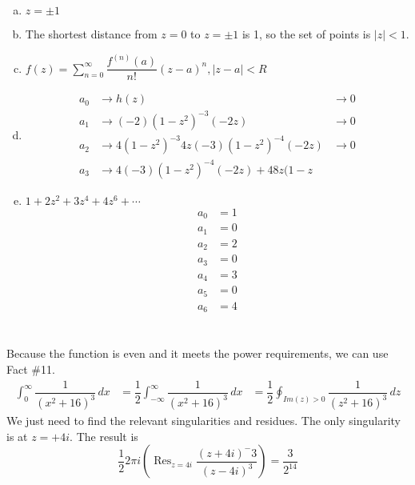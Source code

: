 \documentclass[12pt]{article}
\begin{document}
\section{}
\begin{enumerate}[(a)]
	\item $ z=\pm 1 $
	
	\item The shortest distance from $ z=0 $ to $ z=\pm 1 $ is 1, so the set of points is $ |z| < 1 $.
	
	\item $ f(z) = \sum_{n=0}^{\infty} \dfrac{f^(n)(a)}{n!} (z-a)^n, |z-a| < R$
	
	\item \begin{align*}
		a_0 &\rightarrow h(z) &\rightarrow  0\\
		a_1 &\rightarrow (-2)(1-z^2)^{-3}(-2z) &\rightarrow 0\\
		a_2 &\rightarrow 4(1-z^2)^{-3} 4z(-3)(1-z^2)^{-4}(-2z) &\rightarrow 0\\
		a_3 &\rightarrow 4(-3)(1-z^2)^{-4}(-2z) + 48z(1-z%
	\end{align*}

	\item $ 1 + 2z^2 + 3z^4 + 4z^6 + \cdots $
	\begin{align*}
		a_0 &= 1\\
		a_1 &= 0\\
		a_2 &= 2\\
		a_3 &= 0\\
		a_4 &= 3\\
		a_5 &= 0\\
		a_6 &= 4
	\end{align*}
\end{enumerate}
\newpage

\section{}
Because the function is even and it meets the power requirements, we can use Fact \#11.
\begin{align*}
	\int_{0}^{\infty} \dfrac{1}{(x^2+16)^3} \, dx &= \dfrac{1}{2} \int_{-\infty}^{\infty} \dfrac{1}{(x^2+16)^3} \, dx
	&= \dfrac{1}{2}\oint_{Im(z) > 0} \dfrac{1}{(z^2+16)^3} \, dz
\end{align*}
We just need to find the relevant singularities and residues. The only singularity is at $ z=+4i $. The result is \[ \dfrac{1}{2} 2\pi i (\operatorname{Res}_{z=4i} \dfrac{(z+4i)^-3}{(z-4i)^3}) = \dfrac{3}{2^14} \]
\newpage
\end{document}
